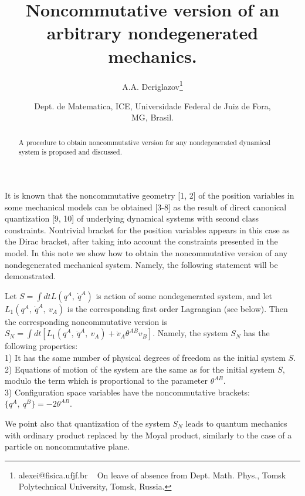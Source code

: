\documentclass[paper a4]{article}
\title{Noncommutative version of an arbitrary nondegenerated mechanics.}
\author{A.A. Deriglazov\footnote{alexei@fisica.ufjf.br ~ On leave of
absence from Dept. Math. Phys., Tomsk Polytechnical University,
Tomsk, Russia.}}
\date{Dept. de Matematica, ICE, Universidade Federal de Juiz de Fora,\\
MG, Brasil.}
\begin{document}
\maketitle
\large
\begin{abstract}
A procedure to obtain noncommutative version for any nondegenerated
dynamical system is proposed and discussed.
\end{abstract}


\noindent
It is known that the
noncommutative geometry [1, 2] of the position variables in some mechanical
models can be obtained [3-8] as the result of direct canonical quantization
[9, 10] of underlying dynamical
systems with second class constraints. Nontrivial bracket for
the position variables appears in this case as the Dirac bracket,
after taking into account the constraints presented in the model.
In this note we show how to
obtain the noncommutative version of any nondegenerated mechanical system.
Namely, the following statement will be demonstrated.

Let $S=\int dt L(q^A, ~ \dot q^A)$ is action of some nondegenerated system,
and let $L_1(q^A, ~ \dot q^A, ~ v_A)$ is
the corresponding first order Lagrangian (see below). Then the corresponding
noncommutative version is
$S_N=\int dt\left[ L_1(q^A, ~ \dot q^A, ~  v_A)+
\dot v_A\theta^{AB}v_B\right]$.
Namely, the system $S_N$ has the following properties: \\
1) It has the same number of physical degrees of freedom as the initial
system $S$. \\
2) Equations of motion of the system are the same as for the initial
system $S$, modulo the term which is proportional to the parameter
$\theta^{AB}$. \\
3) Configuration space variables have the noncommutative brackets:
$\{q^A, ~ q^B\}=-2\theta^{AB}$.

We point also that quantization of the system $S_N$ leads to quantum
mechanics with ordinary product replaced by the Moyal product,
similarly to the case of a particle on noncommutative plane.
\end{document}
